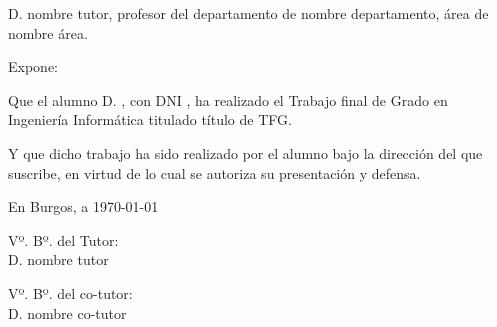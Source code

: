 

\setcounter{chapter}{0}
\let\oldchapter\chapter
\renewcommand\chapter[1]{
    \setcounter{chapter}{\thechapter + 1}
    \setcounter{section}{0}
    \oldchapter*{#1}
    \addcontentsline{toc}{chapter}{#1}
    \markboth{#1}{#1}
}






\thispagestyle{empty}
\cabecera

\vfill

\noindent D. nombre tutor, profesor del departamento de nombre departamento,
área de nombre área.

\noindent Expone:

\noindent Que el alumno D. \theauthor, con DNI \thedni, ha realizado el Trabajo
final de Grado en Ingeniería Informática titulado título de TFG.

\noindent Y que dicho trabajo ha sido realizado por el alumno bajo la dirección
del que suscribe, en virtud de lo cual se autoriza su presentación y defensa.

\begin{center}
	En Burgos, a {\large \today}
\end{center}

\vfill\vfill\vfill

\begin{minipage}{0.45\textwidth}
	\begin{flushleft}
		Vº. Bº. del Tutor:\\[2cm]
		D. nombre tutor
	\end{flushleft}
\end{minipage}
\hfill
\begin{minipage}{0.45\textwidth}
	\begin{flushleft}
		Vº. Bº. del co-tutor:\\[2cm]
		D. nombre co-tutor
	\end{flushleft}
\end{minipage}

\hfill
\vfill


\clearpage
\frontmatter


